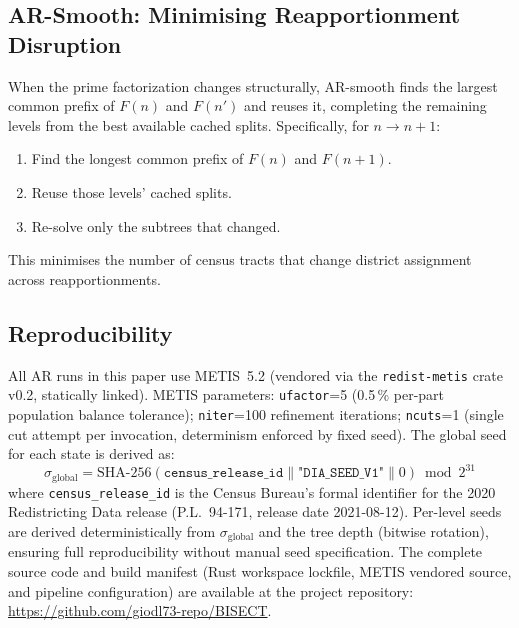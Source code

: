 \subsection{AR-Smooth: Minimising Reapportionment Disruption}
\label{sec:smooth}

When the prime factorization changes structurally, AR-smooth finds the
largest common prefix of $F(n)$ and $F(n')$ and reuses it, completing the
remaining levels from the best available cached splits. Specifically, for
$n \to n+1$:
\begin{enumerate}
  \item Find the longest common prefix of $F(n)$ and $F(n+1)$.
  \item Reuse those levels' cached splits.
  \item Re-solve only the subtrees that changed.
\end{enumerate}
This minimises the number of census tracts that change district assignment
across reapportionments.

\subsection{Reproducibility}
\label{sec:methodology:reproducibility}

All AR runs in this paper use METIS~5.2 (vendored via the \texttt{redist-metis}
crate v0.2, statically linked).
METIS parameters: \texttt{ufactor}=5 (0.5\,\% per-part population balance
tolerance); \texttt{niter}=100 refinement iterations; \texttt{ncuts}=1
(single cut attempt per invocation, determinism enforced by fixed seed).
The global seed for each state is derived as:
\[
  \sigma_{\text{global}} = \mathrm{SHA\text{-}256}(\texttt{census\_release\_id}
    \mathbin{\|} \texttt{"DIA\_SEED\_V1"} \mathbin{\|} 0) \bmod 2^{31}
\]
where \texttt{census\_release\_id} is the Census Bureau's formal identifier for
the 2020 Redistricting Data release (P.L.~94-171, release date 2021-08-12).
Per-level seeds are derived deterministically from $\sigma_{\text{global}}$ and
the tree depth (bitwise rotation), ensuring full reproducibility without manual
seed specification.
The complete source code and build manifest (Rust workspace lockfile, METIS
vendored source, and pipeline configuration) are available at the project
repository: \url{https://github.com/giodl73-repo/BISECT}.
